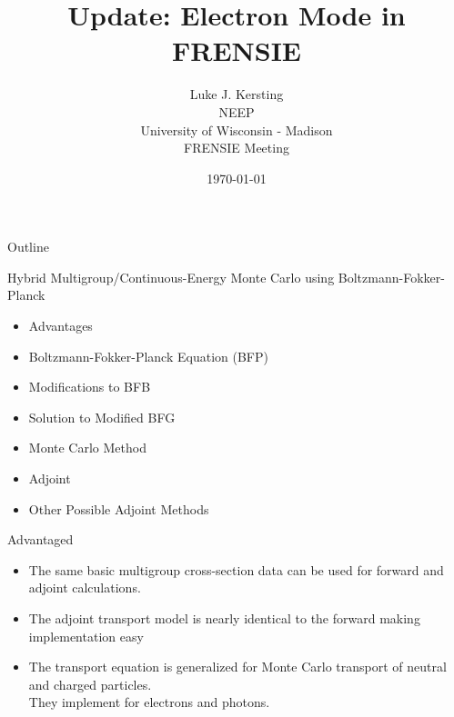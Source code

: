\documentclass{beamer}
\author{Luke J. Kersting
    \\ NEEP
    \\ University of Wisconsin - Madison
    \\ FRENSIE Meeting
}
\date{\today}
\title{Update: Electron Mode in FRENSIE}
\begin{document}
\maketitle

\begin{frame}{Outline}

  \begin{block}{Hybrid Multigroup/Continuous-Energy Monte Carlo using Boltzmann-Fokker-Planck}
    \begin{itemize}
      \item Advantages
      \item Boltzmann-Fokker-Planck Equation (BFP)
      \item Modifications to BFB
      \item Solution to Modified BFG
      \item Monte Carlo Method
      \item Adjoint
      \item Other Possible Adjoint Methods
    \end{itemize}
  \end{block}
    

\end{frame}


\begin{frame}{Advantaged}
 
    \begin{itemize}
      \item The same basic multigroup cross-section data can be used for forward and adjoint calculations. 
       
      \item The adjoint transport model is nearly identical to the forward making implementation easy 

      \item The transport equation is generalized for Monte Carlo transport of neutral and charged particles.\\ They implement for electrons and photons. 

    \end{itemize}

\end{frame}
\end{document}
